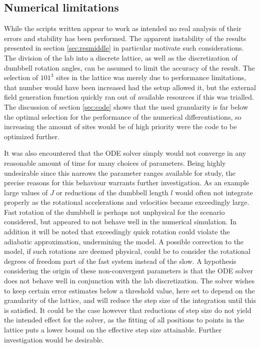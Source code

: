 \documentclass[main.tex]{subfiles}
\begin{document}
\subsection{Numerical limitations}
While the scripts written appear to work as intended no real analysis of their errors and
stability has been performed. The apparent instability of the results presented in section
\ref{sec:resmiddle} in particular motivate such considerations. The division of the lab into a discrete lattice, as well as
the discretization of dumbbell rotation angles, can be assumed to limit the accuracy of the
result. The selection of \(101^3\) sites in the lattice was merely due to performance
limitations, that number would have been increased had the setup allowed it, but the external
field generation function quickly ran out of available resources if this was trialled. The
discussion of section \ref{sec:code} shows that the used granularity is far below the
optimal selection for the performance of the numerical differentiations, so increasing the
amount of sites would be of high priority were the code to be optimized further.

It was also encountered that the ODE solver simply would not converge in any
reasonable amount of time for many
choices of parameters. Being highly undesirable since this narrows the parameter ranges available
for study, the precise reasons for this behaviour warrants further investigation. As an
example large values of \(J\) or reductions of the dumbbell length \(l\) would often not
integrate properly as the rotational accelerations and velocities became exceedingly large.
Fast rotation of the dumbbell is perhaps not unphysical for the scenario considered, but
appeared to not behave well in the numerical simulation. In addition it will be noted that
exceedingly quick rotation could violate the adiabatic approximation, undermining the
model. A possible correction to the model, if such rotations are deemed physical, could be to consider
the rotational degrees of freedom part of the fast system instead of the slow. A hypothesis considering the origin of these non-convergent parameters is that the
ODE solver does not behave well in conjunction with the lab discretization. The solver
wishes to keep certain error estimates below a threshold value, here set to depend on the
granularity of the lattice, and will reduce the step size of the integration until this is
satisfied. It could be the case however that reductions of step size do not yield the
intended effect for the solver, as the fitting of all positions to points in the lattice
puts a lower bound on the effective step size attainable. Further investigation would be
desirable.
\end{document}
